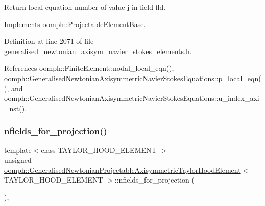 Return local equation number of value j in field fld. 



Implements \hyperlink{classoomph_1_1ProjectableElementBase_ac5c27ae929ff636dc7747fe23fd4f738}{oomph\+::\+Projectable\+Element\+Base}.



Definition at line 2071 of file generalised\+\_\+newtonian\+\_\+axisym\+\_\+navier\+\_\+stokes\+\_\+elements.\+h.



References oomph\+::\+Finite\+Element\+::nodal\+\_\+local\+\_\+eqn(), oomph\+::\+Generalised\+Newtonian\+Axisymmetric\+Navier\+Stokes\+Equations\+::p\+\_\+local\+\_\+eqn(), and oomph\+::\+Generalised\+Newtonian\+Axisymmetric\+Navier\+Stokes\+Equations\+::u\+\_\+index\+\_\+axi\+\_\+nst().

\mbox{\label{classoomph_1_1GeneralisedNewtonianProjectableAxisymmetricTaylorHoodElement_a0fadb5b52ae5980e6826d75e6be982b3}} 
\subsubsection{\texorpdfstring{nfields\+\_\+for\+\_\+projection()}{nfields\_for\_projection()}}
{\footnotesize\ttfamily template$<$class T\+A\+Y\+L\+O\+R\+\_\+\+H\+O\+O\+D\+\_\+\+E\+L\+E\+M\+E\+NT $>$ \\
unsigned \hyperlink{classoomph_1_1GeneralisedNewtonianProjectableAxisymmetricTaylorHoodElement}{oomph\+::\+Generalised\+Newtonian\+Projectable\+Axisymmetric\+Taylor\+Hood\+Element}$<$ T\+A\+Y\+L\+O\+R\+\_\+\+H\+O\+O\+D\+\_\+\+E\+L\+E\+M\+E\+NT $>$\+::nfields\+\_\+for\+\_\+projection (\begin{DoxyParamCaption}{ }\end{DoxyParamCaption})\hspace{0.3cm}{\ttfamily [inline]}, {\ttfamily [virtual]}}



